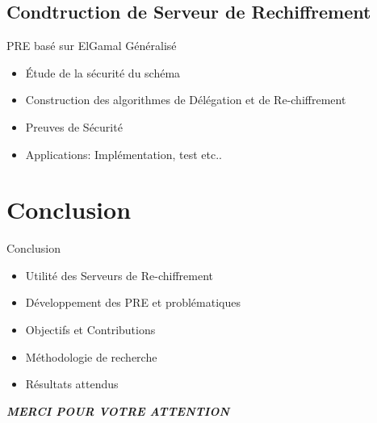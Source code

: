 \documentclass{beamer}
\begin{document}
\subsection{Condtruction de Serveur de Rechiffrement}
\begin{frame}{PRE basé sur ElGamal Généralisé}
	\begin{itemize}
		\item Étude de la sécurité du schéma \pause
		\item Construction des algorithmes de Délégation et de Re-chiffrement \pause
		\item Preuves de Sécurité \pause
		\item Applications: Implémentation, test etc..  \pause
	\end{itemize}
	
\end{frame}

\section{Conclusion}
\begin{frame}{Conclusion}
	
	\begin{itemize}
		\item Utilité des Serveurs de Re-chiffrement \pause
		\item Développement des PRE et problématiques \pause
		\item Objectifs et Contributions \pause
		\item Méthodologie de recherche \pause
		\item Résultats attendus \pause
	\end{itemize}
	
\end{frame}
\begin{frame}[plain]
\centering	\Huge \textbf{\textit{MERCI POUR VOTRE ATTENTION}}
\end{frame}
\end{document}
